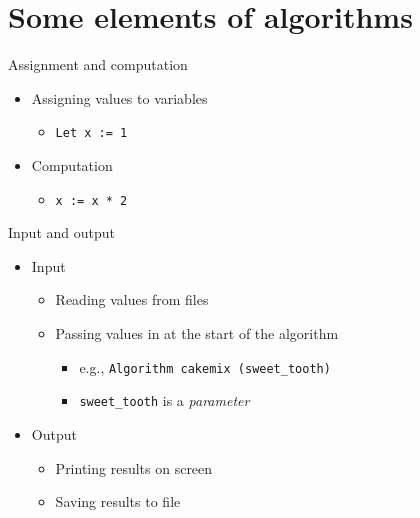 \documentclass[ignorenonframetext,]{beamer}
\providecommand{\tightlist}{%
  \setlength{\itemsep}{0pt}\setlength{\parskip}{0pt}}
\begin{document}
\section{Some elements of algorithms}\label{some-elements-of-algorithms}

\begin{frame}[fragile]{Assignment and computation}

\begin{itemize}[<+->]
\tightlist
\item
  Assigning values to variables

  \begin{itemize}[<+->]
  \tightlist
  \item
    \texttt{Let\ x\ :=\ 1}
  \end{itemize}
\item
  Computation

  \begin{itemize}[<+->]
  \tightlist
  \item
    \texttt{x\ :=\ x\ *\ 2}
  \end{itemize}
\end{itemize}

\end{frame}

\begin{frame}[fragile]{Input and output}

\begin{itemize}[<+->]
\tightlist
\item
  Input

  \begin{itemize}[<+->]
  \tightlist
  \item
    Reading values from files
  \item
    Passing values in at the start of the algorithm

    \begin{itemize}[<+->]
    \tightlist
    \item
      e.g., \texttt{Algorithm\ cakemix\ (sweet\_tooth)}
    \item
      \texttt{sweet\_tooth} is a \emph{parameter}
    \end{itemize}
  \end{itemize}
\item
  Output

  \begin{itemize}[<+->]
  \tightlist
  \item
    Printing results on screen
  \item
    Saving results to file
  \end{itemize}
\end{itemize}

\end{frame}
\end{document}
